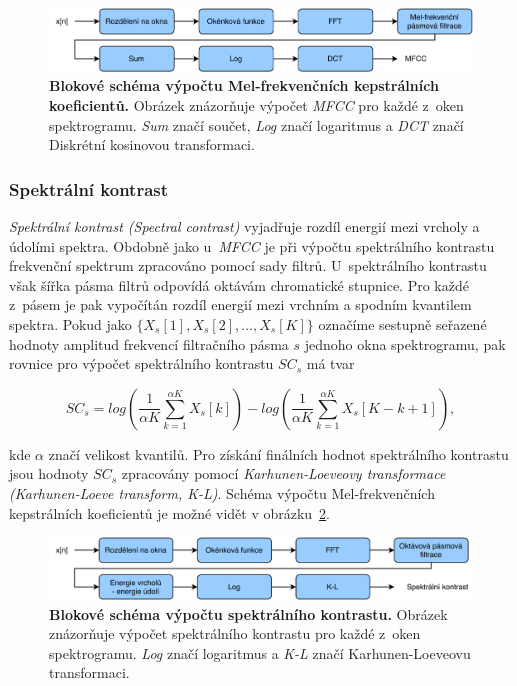 \begin{figure}[h]
    \centering
    \includegraphics[width=\textwidth]{obrazky/MFCC.pdf}
    \caption{\textbf{Blokové schéma výpočtu Mel-frekvenčních kepstrálních koeficientů.} Obrázek znázorňuje výpočet \textit{MFCC} pro každé z~oken spektrogramu. \textit{Sum} značí součet, \textit{Log} značí logaritmus a \textit{DCT} značí Diskrétní kosinovou transformaci.}
    \label{obr_MFCC}
\end{figure}

\subsubsection*{Spektrální kontrast}
\textit{Spektrální kontrast (Spectral contrast)} vyjadřuje rozdíl energií mezi vrcholy a údolími spektra. Obdobně jako u~\textit{MFCC} je při výpočtu spektrálního kontrastu frekvenční spektrum zpracováno pomocí sady filtrů. U~spektrálního kontrastu však šířka pásma filtrů odpovídá oktávám chromatické stupnice. Pro každé z~pásem je pak vypočítán rozdíl energií mezi vrchním a spodním kvantilem spektra. Pokud jako $\{X_s[1], X_s[2], \dots , X_s[K]\}$ označíme sestupně seřazené hodnoty amplitud frekvencí filtračního pásma $s$ jednoho okna spektrogramu, pak rovnice pro výpočet spektrálního kontrastu $SC_s$ má tvar

\begin{equation}
	SC_s = log(\frac{1}{\alpha K} \sum\limits_{k=1}^{\alpha K} X_s[k]) - log(\frac{1}{\alpha K} \sum\limits_{k=1}^{\alpha K} X_s[K-k+1]),
\end{equation}

\medskip

\noindent kde $\alpha$ značí velikost kvantilů. Pro získání finálních hodnot spektrálního kontrastu jsou hodnoty $SC_s$ zpracovány pomocí \textit{Karhunen-Loeveovy transformace (Karhunen-Loeve transform, K-L)}. Schéma výpočtu Mel-frekvenčních kepstrálních koeficientů je možné vidět v obrázku~\ref{obr_SC}.\cite{1035731}\cite{mircom}

\begin{figure}[h]
    \centering
    \includegraphics[width=\textwidth]{obrazky/SC.pdf}
    \caption{\textbf{Blokové schéma výpočtu spektrálního kontrastu.} Obrázek znázorňuje výpočet spektrálního kontrastu pro každé z~oken spektrogramu. \textit{Log} značí logaritmus a \textit{K-L} značí Karhunen-Loeveovu transformaci.}
    \label{obr_SC}
\end{figure}

